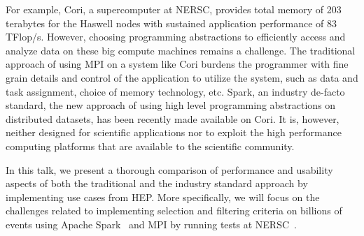 For example, Cori, a supercomputer at NERSC, provides total memory of 203 terabytes for the Haswell nodes with sustained application performance of 83 TFlop/s. 
However,  choosing programming abstractions to efficiently access and analyze data on these big compute machines remains a challenge. 
The traditional approach of using MPI on a system like Cori burdens the programmer with fine grain details and control of the application to utilize the system, such as data and task assignment, choice of memory technology, etc. Spark, an industry de-facto standard, the new approach of using high level programming abstractions on distributed datasets, has been recently made available on Cori. It is, however, neither designed for scientific applications nor to exploit the high performance computing platforms that are 
available to the scientific community.

In this talk, we present a thorough comparison of performance and usability aspects of 
both the traditional and the industry standard approach by implementing use cases from HEP.  
More specifically, we will focus on the challenges related to implementing selection and 
filtering criteria on billions of events using Apache Spark~\cite{spark,spark1} and MPI by running tests at NERSC~\cite{nersc-spark}. 
